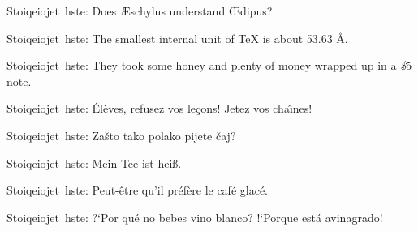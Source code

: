 

\exercise Stoiqeiojet~hste: {\rm Does \AE schylus understand \OE dipus? }

\exercise Stoiqeiojet~hste: 
{\rm The smallest internal unit of \TeX{} is about 53.63 \AA. } 

\exercise Stoiqeiojet~hste: 
{\rm They took some honey and plenty of money wrapped up in a {\it \$}5 note.}

\exercise Stoiqeiojet~hste: 
{\rm \'El\`eves, refusez vos le\c cons! Jetez vos cha\^\i nes! }

\exercise Stoiqeiojet~hste: 
{\rm Za\v sto tako polako pijete \v caj? }

\exercise Stoiqeiojet~hste:
{\rm Mein Tee ist hei\ss. }

\exercise Stoiqeiojet~hste:
{\rm Peut-\^etre qu'il pr\'ef\`ere le caf\'e glac\'e. }

\exercise Stoiqeiojet~hste: 
{\rm ?`Por qu\'e no bebes vino blanco? !`Porque est\'a avinagrado! } 

